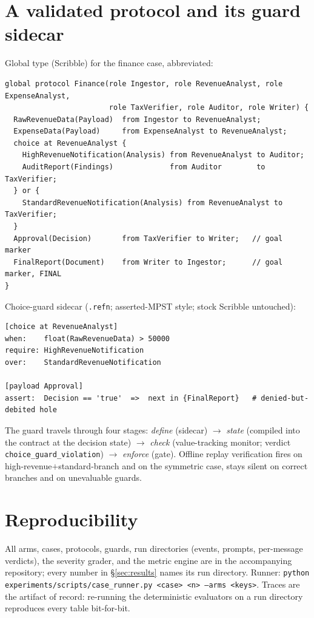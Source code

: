 \documentclass{article}
\begin{document}
\appendix
\section{A validated protocol and its guard sidecar}\label{app:scr}
Global type (Scribble) for the finance case, abbreviated:
{\small\begin{verbatim}
global protocol Finance(role Ingestor, role RevenueAnalyst, role ExpenseAnalyst,
                        role TaxVerifier, role Auditor, role Writer) {
  RawRevenueData(Payload)  from Ingestor to RevenueAnalyst;
  ExpenseData(Payload)     from ExpenseAnalyst to RevenueAnalyst;
  choice at RevenueAnalyst {
    HighRevenueNotification(Analysis) from RevenueAnalyst to Auditor;
    AuditReport(Findings)             from Auditor        to TaxVerifier;
  } or {
    StandardRevenueNotification(Analysis) from RevenueAnalyst to TaxVerifier;
  }
  Approval(Decision)       from TaxVerifier to Writer;   // goal marker
  FinalReport(Document)    from Writer to Ingestor;      // goal marker, FINAL
}
\end{verbatim}}
Choice-guard sidecar (\texttt{.refn}; asserted-MPST style; stock Scribble untouched):
{\small\begin{verbatim}
[choice at RevenueAnalyst]
when:    float(RawRevenueData) > 50000
require: HighRevenueNotification
over:    StandardRevenueNotification

[payload Approval]
assert:  Decision == 'true'  =>  next in {FinalReport}   # denied-but-debited hole
\end{verbatim}}
The guard travels through four stages: \emph{define} (sidecar) $\to$ \emph{state} (compiled into the contract at the decision state) $\to$ \emph{check} (value-tracking monitor; verdict \texttt{choice\_guard\_violation}) $\to$ \emph{enforce} (gate). Offline replay verification fires on high-revenue$+$standard-branch and on the symmetric case, stays silent on correct branches and on unevaluable guards.

\section{Reproducibility}\label{app:repro}
All arms, cases, protocols, guards, run directories (events, prompts, per-message verdicts), the severity grader, and the metric engine are in the accompanying repository; every number in \S\ref{sec:results} names its run directory. Runner: \texttt{python experiments/scripts/case\_runner.py <case> <n> --arms <keys>}. Traces are the artifact of record: re-running the deterministic evaluators on a run directory reproduces every table bit-for-bit.
\end{document}
